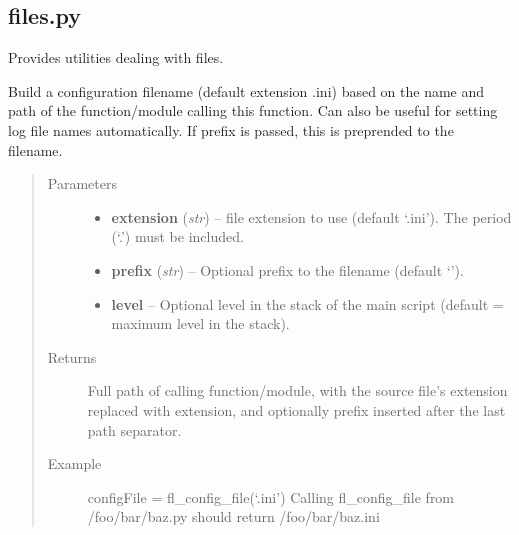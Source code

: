 \documentclass[letterpaper,10pt,english]{sphinxmanual}
\begin{document}
\subsection{files.py}
\label{docs/utilities:files-py}\label{docs/utilities:module-utilities.files}
Provides utilities dealing with files.


\begin{fulllineitems}
\label{docs/utilities:utilities.files.fl_config_file}
Build a configuration filename (default extension .ini) based on the
name and path of the function/module calling this function. Can also
be useful for setting log file names automatically.
If prefix is passed, this is preprended to the filename.
\begin{quote}\begin{description}
\item[{Parameters}] \leavevmode\begin{itemize}
\item {} 
\textbf{extension} (\emph{str}) -- file extension to use (default `.ini'). The
period (`.') must be included.

\item {} 
\textbf{prefix} (\emph{str}) -- Optional prefix to the filename (default `').

\item {} 
\textbf{level} -- Optional level in the stack of the main script
(default = maximum level in the stack).

\end{itemize}

\item[{Returns}] \leavevmode
Full path of calling function/module, with the source file's
extension replaced with extension, and optionally prefix
inserted after the last path separator.

\item[{Example }] \leavevmode
configFile = fl\_config\_file(`.ini') Calling fl\_config\_file from
/foo/bar/baz.py should return /foo/bar/baz.ini

\end{description}\end{quote}

\end{fulllineitems}
\end{document}
